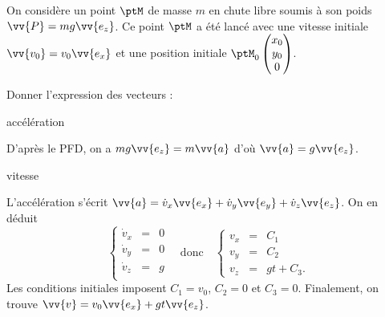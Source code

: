 On considère un point $\ptM$ de masse $m$ en chute libre soumis à son poids $\vv{P}=mg\vv{e_z}$. Ce point $\ptM$ a été lancé avec une vitesse initiale $\vv{v_0} = v_0 \vv{e_x}$ et une position initiale $\ptM_0 \begin{pmatrix}x_0 \\ y_0 \\0\end{pmatrix}$.

Donner l'expression des vecteurs :


\debutEntrainement

\begin{enonce}
	 accélération
\end{enonce}


\begin{corrige}
  D'après le PFD, on a $mg\vv{e_z}=m\vv{a}$ d'où $\vv{a}=g \vv{e_z}$.
\end{corrige}



\begin{enonce}
	 vitesse
\end{enonce}


\begin{corrige}
  L'accélération s'écrit $\vv{a}=\dot{v}_x\vv{e_x}+\dot{v}_y\vv{e_y}+\dot{v}_z\vv{e_z}$. On en déduit 
  \[
  	\left\{
	\begin{array}{ccc}
  		\dot{v}_x&=&0\\
  		\dot{v}_y&=&0\\
  		\dot{v}_z&=&g\\
  	\end{array}
	\right.
	\quad\text{donc}\quad
  	\left\{
	\begin{array}{ccc}
  		v_x&=&C_1\\
  		v_y&=&C_2\\
  		v_z&=&gt+C_3.
  	\end{array}
	\right.
  \]
  Les conditions initiales imposent $C_1=v_0$, $C_2=0$ et $C_3=0$. Finalement, on trouve $\vv{v}=v_0 \vv{e_x} + g t \vv{e_z}$.
\end{corrige}

